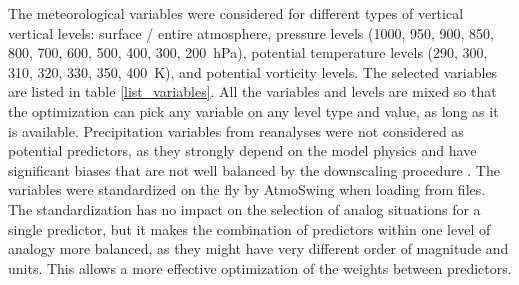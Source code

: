 \documentclass[draft]{agujournal2019}
\begin{document}
The meteorological variables were considered for different types of vertical vertical levels: surface / entire atmosphere, pressure levels (1000, 950, 900, 850, 800, 700, 600, 500, 400, 300, 200~hPa), potential temperature levels (290, 300, 310, 320, 330, 350, 400~K), and potential vorticity levels. The selected variables are listed in table \ref{list_variables}. All the variables and levels are mixed so that the optimization can pick any variable on any level type and value, as long as it is available. Precipitation variables from reanalyses were not considered as potential predictors, as they strongly depend on the model physics \cite{Rienecker2011} and have significant biases that are not well balanced by the downscaling procedure \cite{Dayon2015}. The variables were standardized on the fly by AtmoSwing when loading from files. The standardization has no impact on the selection of analog situations for a single predictor, but it makes the combination of predictors within one level of analogy more balanced, as they might have very different order of magnitude and units. This allows a more effective optimization of the weights between predictors. 
\end{document}
